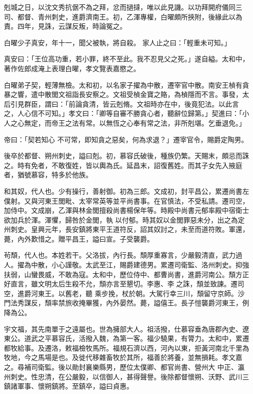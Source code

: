 \begin{pinyinscope}
 剋城之日，以沈文秀抗倨不為之拜，忿而撾撻，唯以此見譏。以功拜開府儀同三司、都督、青州刺史，進爵濟南王。初，乙渾專權，白曜頗所挾附，後緣此以為責。四年，見誅，云謀反叛，時論冤之。



 白曜少子真安，年十一，聞父被執，將自殺。
 家人止之曰：「輕重未可知。」



 真安曰：「王位高功重，若小罪，終不至此。我不忍見父之死。」遂自縊。太和中，著作佐郎成淹上表理白曜，孝文覽表嘉愍之。



 白曜弟子契，輕薄無檢。太和初，以名家子擢為中散，遷宰官中散。南安王楨有貪暴之響，遣中散閭文祖詣長安察之。文祖受楨金寶之賂，為楨隱而不言。事發，太后引見群臣，謂曰：「前論貪清，皆云剋脩。文祖時亦在中，後竟犯法。以此言之，人心信不可知。」孝文曰：「卿等自審不勝貪心者，聽辭位歸第。」契進曰：「小人之心無定，而帝王之法有常。以無恆之心奉有常之法，非所剋堪。乞垂退免。」



 帝曰：「契若知心
 不可常，即知貪之惡矣，何為求退？」遷宰官令，賜爵定陶男。



 後卒於都督、朔州刺史，謚曰剋。初，慕容氏破後，種族仍繁。天賜末，頗忌而誅之。時有免者，不敢復姓，皆以輿為氏。延昌末，詔復舊姓。而其子女先入掖庭者，猶號慕容，特多於他族。



 和其奴，代人也。少有操行，善射御。初為三郎。文成初，封平昌公，累遷尚書左僕射。又與河東王閭毗、太宰常英等並平尚書事。在官慎法，不受私請。遷司空，加侍中。文成崩，乙渾與林金閭擅殺尚書楊保年等。時殿中尚書元郁率殿中宿衛士欲加兵於渾。渾懼，歸咎於金閭，執
 以付郁。時其奴以金閭罪惡未分，出之為定州刺史。皇興元年，長安鎮將東平王道符反，詔其奴討之，未至而道符敗。軍還，薨，內外歎惜之。贈平昌王，謚曰宣。子受襲爵。



 茍頹，代人也。本姓若干。父洛拔，內行長。頹厚重寡言，少嚴毅清直，武力過人。擢為中散，小心謹敬。太武至江，賜爵建德男。累遷司衛監、洛州刺史。抑強扶弱，山蠻畏威，不敢為寇。太和中，歷位侍中、都曹尚書，進爵河南公。頹方正好直言，雖文明太后生殺不允，頹亦言至懇切。李惠、李之誅，頹並致諫。遷司空，進爵河東王。以舊老，聽
 乘步挽，杖於朝。大駕行幸三川，頹留守京師。沙門法秀謀反，頹率禁旅收掩畢獲，內外晏然。薨，謚僖王。長子愷襲爵河東王，例降為公。



 宇文福，其先南單于之遠屬也。世為擁部大人。祖活撥，仕慕容垂為唐郡內史、遼東公。道武之平慕容氏，活撥入魏，為第一客。福少驍果，有膂力。太和中，累遷都牧給事。及遷洛，敕福檢牧馬所。福規石濟以西，河內以東，拒黃河南北千里為牧地，今之馬場是也。及徙代移雜畜牧於其所，福善於將養，並無損耗。孝文嘉之。尋補司衛監。後以勛封襄樂縣男，歷位太僕卿、都官尚書、營州大
 中正、瀛州刺史。性忠清，在公嚴毅，以信御人，甚得聲譽。後除都督懷朔、沃野、武川三鎮諸軍事、懷朔鎮將。至鎮卒，謚曰貞惠。




\end{pinyinscope}
